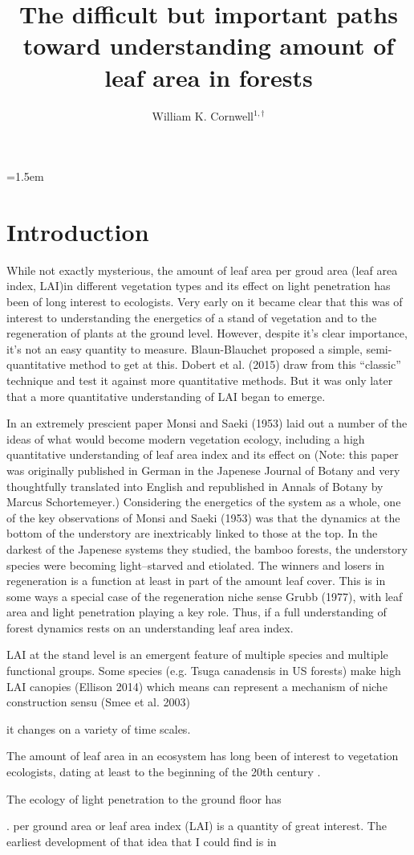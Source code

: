 \documentclass[a4paper,11pt]{article}
\title{The difficult but important paths toward understanding amount of leaf area in forests}
\author{
William K. Cornwell$^{1,\dag}$
}
\date{}
\affiliation{
$^{1}$ Ecology and Evolution Research Centre, School of Biological, Earth and Environmental Sciences, University of New South Wales, Sydney, NSW 2052, Australia\\
$^{*}$ Email for correspondence: \texttt{wcornwell@gmail.com}\\
}
\begin{document}
	
	\mstitlepage
	\parindent=1.5em
	\addtolength{\parskip}{.3em}
	\vfill
	
	\newpage
	
	\section{Introduction}
	
	While not exactly mysterious, the amount of leaf area per groud area (leaf area index, LAI)in different vegetation types and its effect on light penetration has been of long interest to ecologists.  Very early on it became clear that this was of interest to understanding the energetics of a stand of vegetation and to the regeneration of plants at the ground level.  However, despite it's clear importance, it's not an easy quantity to measure.  Blaun-Blauchet proposed a simple, semi-quantitative method to get at this.  Dobert et al. (2015) draw from this ``classic'' technique and test it against more quantitative methods.  But it was only later that a more quantitative understanding of LAI began to emerge.  
	
	In an extremely prescient paper Monsi and Saeki (1953) laid out a number of the ideas of what would become modern
	vegetation ecology, including a high quantitative understanding of leaf area index and its effect on (Note: this paper was originally published in German in the Japenese Journal of Botany and very thoughtfully translated into English and republished in Annals of Botany by Marcus Schortemeyer.)  Considering the energetics of the system as a whole, one of the key observations of Monsi and Saeki (1953) was that the dynamics at the bottom of the understory are inextricably linked to those at the top.  In the darkest of the Japenese systems they studied, the bamboo forests, the understory species were becoming light--starved and etiolated. The winners and losers in regeneration is a function at least in part of the amount leaf cover.  This is in some ways a special case of the regeneration niche sense Grubb (1977), with leaf area and light penetration playing a key role.  Thus, if a full understanding of forest dynamics rests on an understanding leaf area index.  
	
    LAI at the stand level is an emergent feature of multiple species and multiple functional groups.  Some species (e.g. Tsuga canadensis in US forests) make high LAI canopies (Ellison 2014) which means can represent a mechanism of niche construction sensu (Smee et al. 2003)

    it changes on a variety of time scales.  
	
	The amount of leaf area in an ecosystem has long been of interest to vegetation ecologists, dating at least to the beginning of the 20th century \citep{Blaun-Blauchet}.  
	
	The ecology of light penetration to the ground floor has 
	
	.  per ground area or leaf area index (LAI) is a quantity of great interest.  The earliest development of that idea that I could find is in 
\end{document}

